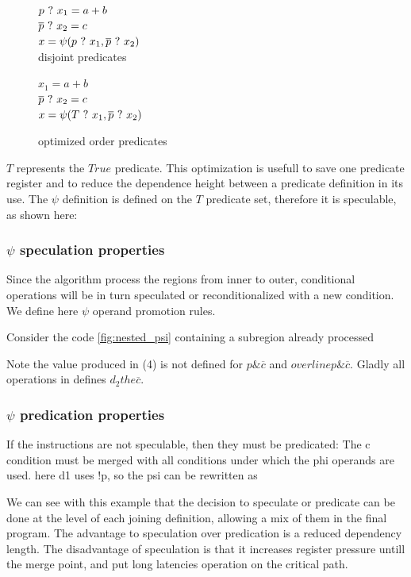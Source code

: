 \begin{figure}
\footnotesize
\begin{minipage}{6cm}
$ p ~?~ x_1 = a + b $ \\
$ \overline{p} ~?~ x_2 = c $ \\
$ x = \psi(p ~?~ x_1, \overline{p} ~?~ x_2) $ \\
\caption{disjoint predicates}
\end{minipage}
\begin{minipage}{6cm}
$ x_1 = a + b $ \\
$ \overline{p} ~?~ x_2 = c $ \\
$ x = \psi(T ~?~ x_1, \overline{p} ~?~ x_2) $ \\
\caption{optimized order predicates}
\end{minipage}
\end{figure}

$T$ represents the $True$ predicate. This optimization is usefull to save one predicate register and to reduce the dependence height between a predicate definition in its use. 
The $\psi$ definition is defined on the $T$ predicate set, therefore it is speculable, as shown here:

     \subsubsection{$\psi$ speculation properties}

Since the algorithm process the regions from inner to outer, conditional operations will be in turn speculated or reconditionalized with a new condition. We define here $\psi$ operand promotion rules.

Consider the code \ref{fig:nested_psi}  containing a subregion already processed

Note the value produced in (4) is not defined for $p \& \overline{c}$ and $overline{p} \& \overline{c}$. Gladly all operations in defines $d_2 the \overline{c}$.

\subsubsection{$\psi$ predication properties}

If the instructions are not speculable, then they must be predicated:
The c condition must be merged with all conditions under which the phi operands are used. here d1 uses !p, so the psi can be rewritten as

We can see with this example that the decision to speculate or predicate can be done at the level of each joining definition, allowing a mix of them in the final program. The advantage to speculation over predication is a reduced dependency length. The disadvantage of speculation is that it increases register pressure untill the merge point, and put long latencies operation on the critical path.
 
